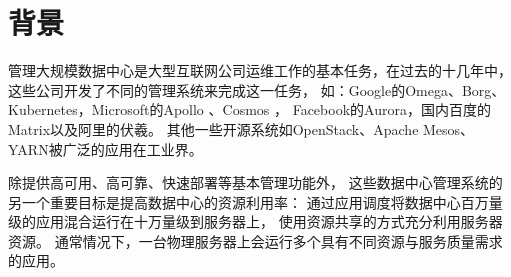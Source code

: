 %

\section{背景}

管理大规模数据中心是大型互联网公司运维工作的基本任务，在过去的十几年中，
这些公司开发了不同的管理系统来完成这一任务，
如：Google的Omega\cite{Schwarzkopf_omega_2013}、Borg\cite{borg:2015}、
Kubernetes\cite{Kubernetes}，Microsoft的Apollo \cite{Apollo}、Cosmos \cite{Cosmos}，
Facebook的Aurora\cite{Aurora}，国内百度的Matrix以及阿里的伏羲\cite{Fuxi}。
其他一些开源系统如OpenStack\cite{OpenStack}、Apache Mesos\cite{Hindman:2011:Mesos}、
YARN\cite{YARN}被广泛的应用在工业界。

除提供高可用、高可靠、快速部署等基本管理功能外，
这些数据中心管理系统的另一个重要目标是提高数据中心的资源利用率：
通过应用调度将数据中心百万量级的应用混合运行在十万量级到服务器上，
使用资源共享的方式充分利用服务器资源。
通常情况下，一台物理服务器上会运行多个具有不同资源与服务质量需求的应用。

